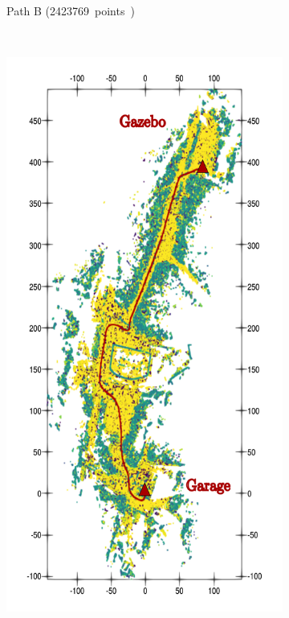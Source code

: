 \begin{figure}[h!]
\begin{center}
\begin{subfigure}[b]{0.32\textwidth}
			\label{fig:ltr_b}
			\caption{Path B (\SI{2423769} points)}
		\end{subfigure}%
		~
		\begin{subfigure}[b]{0.32\textwidth}
			\includegraphics[width=\linewidth]{figs/ltr_map_traj/path_c.pdf}

\end{subfigure}
\end{center}
\end{figure}
